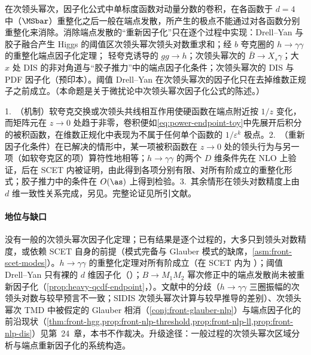 \begin{proposition}\label{prop:power-nlp-endpoint}
在次领头幂次，因子化公式中单标度函数对动量分数的卷积，在各函数于 $d=4$ 中（$\MSbar$）重整化之后一般在端点发散，所产生的极点不能通过对各函数分别重整化来消除。消除端点发散的“重新因子化”只在逐个过程中实现：Drell--Yan 与胶子融合产生 Higgs 的阈值区次领头幂次领头对数重求和\cite{Beneke:2018gvs,Beneke:2019mua}；经 $b$ 夸克圈的 $h\to\gamma\gamma$ 的重整化端点因子化定理\cite{Liu:2019oav,Liu:2020wbn}；%
轻夸克诱导的 $gg\to h$\cite{Liu:2022ajh}；次领头幂次的 $\bar B\to X_s\gamma$\cite{Hurth:2023paz}；大 $x$ 处 DIS 的非对角道\cite{Beneke:2020ibj}与“胶子推力”中的端点因子化条件\cite{Beneke:2022obx}；次领头幂次的 DIS 与 PDF 因子化\cite{Beneke:2026miy}（预印本）。阈值 Drell--Yan 在次领头幂次的因子化只在去掉维数正规子之前成立\cite{Beneke:2019oqx}。（本命题是关于微扰论中次领头幂次因子化公式的陈述。）
\end{proposition}

\begin{proofsketch}
1.~（机制）软夸克交换或次领头共线相互作用使硬函数在端点附近按 $1/z$ 变化，而矩阵元在 $z\to0$ 处趋于非零，卷积便如\eqref{eq:power-endpoint-toy}中先展开后积分的被积函数，在维数正规化中表现为不属于任何单个函数的 $1/\varepsilon^k$ 极点\cite{Liu:2019oav,Beneke:2019oqx}。2.~（重新因子化条件）在已解决的情形中，某一项被积函数在 $z\to0$ 处的领头行为与另一项（如软夸克区的项）算符性地相等；$h\to\gamma\gamma$ 的两个 $D$ 维条件先在 NLO 上验证\cite{Liu:2019oav}，后在 SCET 内被证明，由此得到各项分别有限、对所有阶成立的重整化形式\cite[第~3~节]{Liu:2020wbn}；胶子推力中的条件在 $O(\as)$ 上得到检验\cite{Beneke:2022obx}。3.~其余情形在领头对数精度上由 $d$ 维一致性关系完成\cite{Beneke:2018gvs,Beneke:2019mua,Beneke:2020ibj}，另见\cite{Hurth:2023paz,Beneke:2026miy}。完整论证见所引文献。
\end{proofsketch}

\paragraph{地位与缺口}
没有一般的次领头幂次因子化定理；已有结果是逐个过程的，大多只到领头对数精度，或依赖 SCET 自身的前提（模式完备与 Glauber 模式的缺席，\cref{asm:front-scet-modes}）。$h\to\gamma\gamma$ 的重整化定理对所有阶成立（在 SCET 内为 \tagA）；阈值 Drell--Yan 只有裸的 $d$ 维因子化（\tagP）；$B\to M_1M_2$ 幂次修正中的端点发散尚未被重新因子化（\cref{prop:heavy-qcdf-endpoint}，\tagV）。文献中的分歧（$h\to\gamma\gamma$ 三圈振幅的次领头对数与较早预言\cite{Akhoury:2001mz}不一致\cite{Liu:2020wbn}；SIDIS 次领头幂次计算与较早推导的差别\cite{Rodini:2023plb}）、次领头幂次 TMD 中被假定的 Glauber 相消（\cref{conj:front-glauber-nlp}）与端点因子化的前沿现状（\cref{thm:front-hgg,prop:front-nlp-threshold,prop:front-nlp-ll,prop:front-nlp-dis}）见第~24~章，本书不作裁决。升级途径：一般过程的次领头幂次区域分析与端点重新因子化的系统构造。
